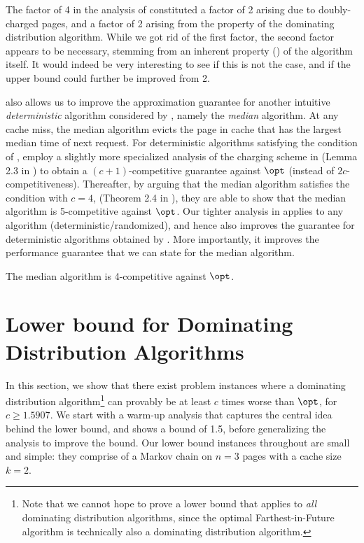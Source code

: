 \documentclass[11pt]{article}
\begin{document}
\begin{remark}
    \label{remark:2-correct-answer-for-dom}
    The factor of 4 in the analysis of \cite{lund1994ip} constituted a factor of 2 arising due to doubly-charged pages, and a factor of 2 arising from the property of the dominating distribution algorithm. While we got rid of the first factor, the second factor appears to be necessary, stemming from an inherent property () of the algorithm itself. It would indeed be very interesting to see if this is not the case, and if the upper bound could further be improved from 2.
\end{remark}

 also allows us to improve the approximation guarantee for another intuitive \textit{deterministic} algorithm considered by \cite{lund1999paging}, namely the \textit{median} algorithm. At any cache miss, the median algorithm evicts the page in cache that has the largest median time of next request. For deterministic algorithms satisfying the condition of , \cite{lund1999paging} employ a slightly more specialized analysis of the charging scheme in  (Lemma 2.3 in \cite{lund1999paging}) to obtain a $(c+1)$-competitive guarantee against $\opt$ (instead of $2c$-competitiveness). Thereafter, by arguing that the median algorithm satisfies the condition with $c=4$, (Theorem 2.4 in \cite{lund1999paging}), they are able to show that the median algorithm is 5-competitive against $\opt$. Our tighter analysis in  applies to any algorithm (deterministic/randomized), and hence also improves the guarantee for deterministic algorithms obtained by \cite{lund1999paging}. More importantly, it improves the performance guarantee that we can state for the median algorithm.

\begin{corollary}
    \label{corollary:median-is-4-competitive}
    The median algorithm is 4-competitive against $\opt$.
\end{corollary}
 \section{Lower bound for Dominating Distribution Algorithms}
\label{sec:lb}

In this section, we show that there exist problem instances where a dominating distribution algorithm\footnote{Note that we cannot hope to prove a lower bound that applies to \textit{all} dominating distribution algorithms, since the optimal Farthest-in-Future algorithm is technically also a dominating distribution algorithm.} can provably be at least $c$ times worse than $\opt$, for $c \ge 1.5907$. We start with a warm-up analysis that captures the central idea behind the lower bound, and shows a bound of 1.5, before generalizing the analysis to improve the bound. Our lower bound instances throughout are small and simple: they comprise of a Markov chain on $n=3$ pages with a cache size $k=2$.
\end{document}
